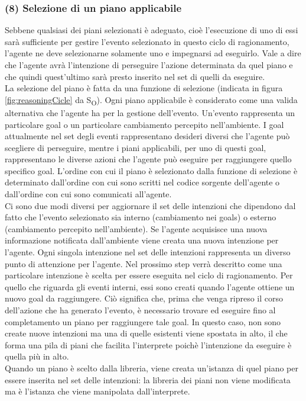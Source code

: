 \documentclass[12pt,a4paper,openright,twoside]{report}
\begin{document}
\subsubsection{(8) Selezione di un piano applicabile}
Sebbene qualsiasi dei piani selezionati \`e adeguato, cio\`e l'esecuzione di uno di essi sar\`a sufficiente per gestire l'evento selezionato in questo ciclo di ragionamento, l'agente ne deve selezionarne solamente uno e impegnarsi ad eseguirlo. Vale a dire che l'agente avr\`a l'intenzione di perseguire l'azione determinata da quel piano e che quindi quest'ultimo sar\`a presto inserito nel set di quelli da eseguire.
\\
La selezione del piano \`e fatta da una funzione di selezione (indicata in figura \ref{fig:reasoningCicle} da S\textsubscript{O}). Ogni piano applicabile \`e considerato come una valida alternativa che l'agente ha per la gestione dell'evento. Un'evento rappresenta un particolare goal o un particolare cambiamento percepito nell'ambiente. I goal attualmente nel set degli eventi rappresentano desideri diversi che l'agente pu\`o scegliere di perseguire, mentre i piani applicabili, per uno di questi goal, rappresentano le diverse azioni che l'agente pu\`o eseguire per raggiungere quello specifico goal.
L'ordine con cui il piano \`e selezionato dalla funzione di selezione \`e determinato dall'ordine con cui sono scritti nel codice sorgente dell'agente o dall'ordine con cui sono comunicati all'agente.
\\
Ci sono due modi diversi per aggiornare il set delle intenzioni che dipendono dal fatto che l'evento selezionato sia interno (cambiamento nei goals) o esterno (cambiamento percepito nell'ambiente).
Se l'agente acquisisce una nuova informazione notificata dall'ambiente viene creata una nuova intenzione per l'agente. Ogni singola intenzione nel set delle intenzioni rappresenta un diverso punto di attenzione per l'agente. Nel prossimo step verr\`a descritto come una particolare intenzione \`e scelta per essere eseguita nel ciclo di ragionamento.
Per quello che riguarda gli eventi interni, essi sono creati quando l'agente ottiene un nuovo goal da raggiungere. Ci\`o significa che, prima che venga ripreso il corso dell'azione che ha generato l'evento, \`e necessario trovare ed eseguire fino al completamento un piano per raggiungere tale goal. In questo caso, non sono create nuove intenzioni ma una di quelle esistenti viene spostata in alto, il che forma una pila di piani che facilita l'interprete poich\`e l'intenzione da eseguire \`e quella pi\`u in alto.
\\
Quando un piano \`e scelto dalla libreria, viene creata un'istanza di quel piano per essere inserita nel set delle intenzioni: la libreria dei piani non viene modificata ma \`e l'istanza che viene manipolata dall'interprete.
\end{document}
